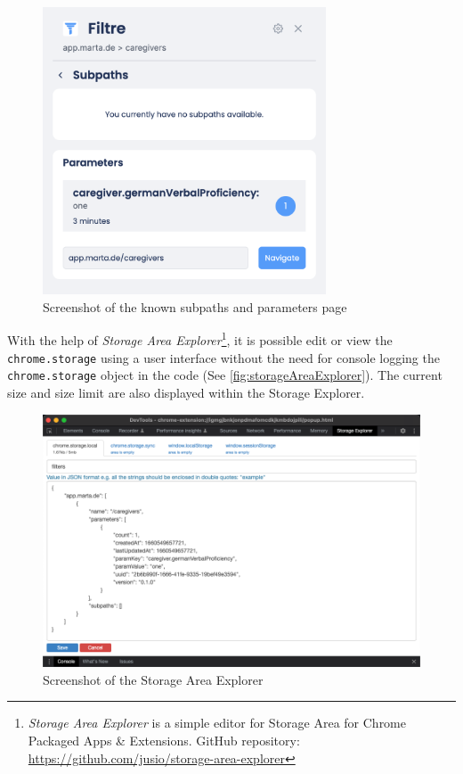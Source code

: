 \begin{figure}[ht!]
  \centering
  \includegraphics[width=0.75\textwidth]{assets/Filtre_parameters.png}
  \caption{Screenshot of the known subpaths and parameters page}
  \label{fig:filtreParameters}
\end{figure}

With the help of \emph{Storage Area Explorer}\footnote{\emph{Storage Area Explorer} is a simple editor for Storage Area for Chrome Packaged Apps \& Extensions. GitHub repository: \url{https://github.com/jusio/storage-area-explorer}}, it is possible edit or view the \texttt{chrome.storage} using a user interface without the need for console logging the \texttt{chrome.storage} object in the code (See \autoref{fig:storageAreaExplorer}). The current size and size limit are also displayed within the Storage Explorer.

\begin{figure}[ht!]
  \includegraphics[width=\textwidth]{assets/Storage_area_explorer.png}
  \caption{Screenshot of the Storage Area Explorer}
  \label{fig:storageAreaExplorer}
\end{figure}

